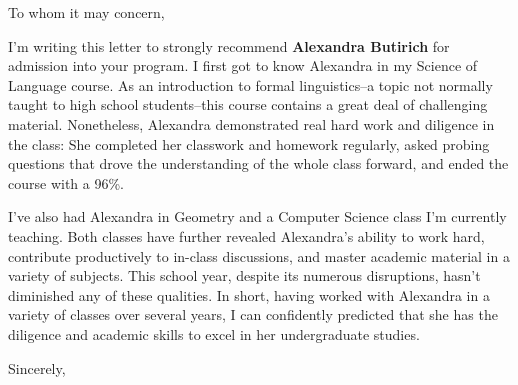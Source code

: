 \documentclass{letter}
\begin{document}
\begin{letter}{}
\opening{To whom it may concern,}

I'm writing this letter to strongly recommend  \textbf{Alexandra Butirich} for admission into your program.  I first got to know Alexandra in my Science of Language course. As an introduction to formal linguistics--a topic not normally taught to high school students--this course contains a great deal of challenging material. Nonetheless, Alexandra demonstrated real hard work and diligence in the class: She completed her classwork and homework regularly, asked probing  questions that drove the understanding of the whole class forward, and ended the course with a 96\%.  

I've also had Alexandra in Geometry  and a Computer Science class I'm currently teaching.    Both classes have further revealed Alexandra's ability to work hard, contribute productively to in-class discussions, and master academic material in a variety of subjects.  This school year, despite its numerous disruptions, hasn't diminished any of these qualities.   In short, having worked with Alexandra in a variety of classes over several years, I can confidently predicted that she has the diligence and academic skills  to  excel in her undergraduate studies.

\closing{Sincerely,}

\end{letter}
\end{document}
